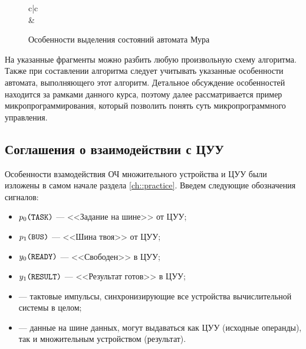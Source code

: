 \begin{figure}[!ht]
\begin{tabular}{c|c}
{            }
			\\
        {}            
        &
            {}            
    \end{tabular}
    \caption{Особенности выделения состояний автомата Мура}
    \label{fig::ch::practice::MooreAlgFictive}
\end{figure}


На указанные фрагменты можно разбить любую произвольную схему алгоритма. Также при составлении алгоритма следует учитывать указанные особенности автомата, выполняющего этот алгоритм. Детальное обсуждение особенностей находится за рамками данного курса, поэтому далее рассматривается пример микропрограммирования, который позволить понять суть микропрограммного управления.

\subsection{Соглашения о взаимодействии с ЦУУ}

Особенности взамодействия ОЧ множительного устройства и ЦУУ были изложены в самом начале раздела \ref{ch::practice}. Введем следующие обозначения сигналов:
\begin{itemize}
    \item $p_0\texttt{(TASK)}$ --- <<Задание на шине>> от ЦУУ;
    \item $p_1\texttt{(BUS)}$ --- <<Шина твоя>> от ЦУУ;
    \item $y_0\texttt{(READY)}$ --- <<Свободен>> в ЦУУ;
    \item $y_1\texttt{(RESULT)}$ --- <<Результат готов>> в ЦУУ;
    \item {} --- тактовые импульсы, синхронизирующие все устройства вычислительной системы в целом;
    \item {} --- данные на шине данных, могут выдаваться как ЦУУ (исходные операнды), так и множительным устройством (результат).
\end{itemize}

